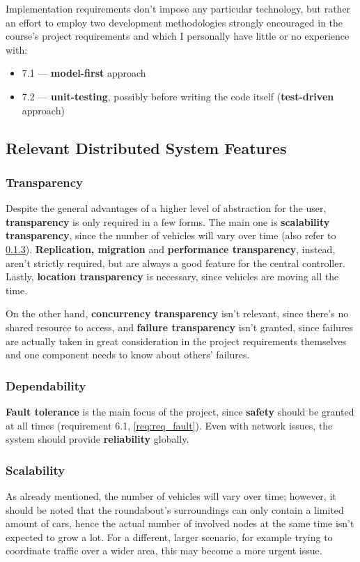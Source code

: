 Implementation requirements don't impose any particular technology, but rather
an effort to employ two development methodologies strongly encouraged in the
course's project requirements and which I personally have little or no
experience with:
\begin{itemize}
  \item 7.1\label{req:model-first} --- \textbf{model-first} approach
  \item 7.2\label{req:test} --- \textbf{unit-testing}, possibly before writing the code itself
  (\textbf{test-driven} approach)
\end{itemize}


\subsection{Relevant Distributed System Features}

\subsubsection{Transparency}\label{req:distr_transparency}
Despite the general advantages of a higher level of abstraction for the user,
\textbf{transparency} is only required in a few forms. The main one is
\textbf{scalability transparency}, since the number of vehicles will vary over
time (also refer to \ref{req:distr_scalability}). \textbf{Replication, migration}
and \textbf{performance transparency}, instead, aren't strictly required, but
are always a good feature for the central controller. Lastly, \textbf{location
transparency} is necessary, since vehicles are moving all the time.

On the other hand, \textbf{concurrency transparency} isn't relevant, since
there's no shared resource to access, and \textbf{failure transparency} isn't
granted, since failures are actually taken in great consideration in the project
requirements themselves and one component needs to know about others' failures.

\subsubsection{Dependability}\label{req:distr_dependability}
\textbf{Fault tolerance} is the main focus of the project, since \textbf{safety}
should be granted at all times (requirement 6.1, \ref{req:req_fault}). Even with
network issues, the system should provide \textbf{reliability} globally.

\subsubsection{Scalability}\label{req:distr_scalability}
As already mentioned, the number of vehicles will vary over time; however, it
should be noted that the roundabout's surroundings can only contain a limited
amount of cars, hence the actual number of involved nodes at the same time isn't
expected to grow a lot. For a different, larger scenario, for example trying to
coordinate traffic over a wider area, this may become a more urgent issue.

